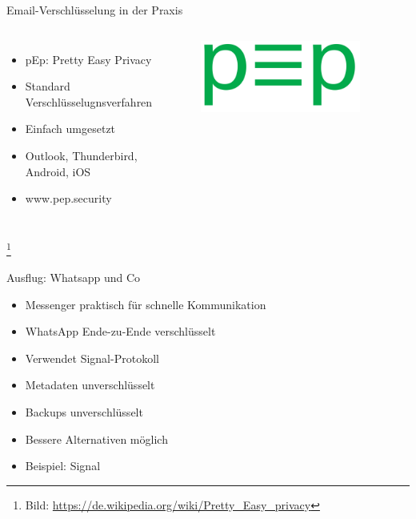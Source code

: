 \documentclass[10pt]{beamer}
\newcommand\blfootnote[1]{%
	\begingroup
	\renewcommand\thefootnote{}\footnote{#1}%
	\addtocounter{footnote}{-1}%
	\endgroup
}
\begin{document}
%
%
\begin{frame}[fragile]{Email-Verschlüsselung in der Praxis}
\begin{columns}[T,c,onlytextwidth]
	\begin{itemize}
		\item pEp: Pretty Easy Privacy
		\item Standard Verschlüsselugnsverfahren
		\item Einfach umgesetzt
		\item Outlook, Thunderbird, Android, iOS
		\item www.pep.security
	\end{itemize}
	\begin{figure}
		\includegraphics[width=0.9\textwidth]{images/pep}
	\end{figure}
\end{columns}
\blfootnote{Bild: \href{https://de.wikipedia.org/wiki/Pretty_Easy_privacy}{https://de.wikipedia.org/wiki/Pretty\_Easy\_privacy}}
\end{frame}

%
%
\begin{frame}[fragile]{Ausflug: Whatsapp und Co}
	\begin{itemize}
	\item Messenger praktisch für schnelle Kommunikation
	\item WhatsApp Ende-zu-Ende verschlüsselt
	\item Verwendet Signal-Protokoll
	\item Metadaten unverschlüsselt
	\item Backups unverschlüsselt
	\item Bessere Alternativen möglich
	\item Beispiel: Signal
\end{itemize}
\end{frame}
\end{document}
